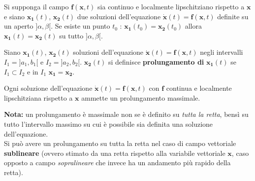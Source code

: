 \documentclass[10pt, oneside]{book}
\theoremstyle{plain}
\begin{document}
\begin{prop}
Si supponga il campo $\mathbf{f}(\mathbf{x}, t)$ sia continuo e localmente lipschitziano rispetto a $\mathbf{x}$ e siano $\mathbf{x_1}(t)$, $\mathbf{x_2}(t)$ due soluzioni dell'equazione $\dot{\mathbf{x}}(t) = \mathbf{f}(\mathbf{x}, t)$ definite su un aperto $]\alpha, \beta[$. Se esiste un punto $t_0$ : $\mathbf{x_1}(t_0) = \mathbf{x_2}(t_0)$ allora $\mathbf{x_1}(t) = \mathbf{x_2}(t)$ su tutto $]\alpha, \beta[$.
\end{prop} 

\begin{defin}
Siano $\mathbf{x_1}(t)$, $\mathbf{x_2}(t)$ soluzioni dell'equazione $\dot{\mathbf{x}}(t) = \mathbf{f}(\mathbf{x}, t)$ negli intervalli $I_1 = ]a_1, b_1[$ e $I_2 = ]a_2, b_2[$. $\mathbf{x_2}(t)$ si definisce \textbf{prolungamento di} $\mathbf{x_1}(t)$ se $I_1 \subset I_2$ e in $I_1$ $\mathbf{x_1} = \mathbf{x_2}$.
\end{defin}

\begin{ther}
Ogni soluzione dell'equazione $\dot{\mathbf{x}}(t) = \mathbf{f}(\mathbf{x}, t)$ con $\mathbf{f}$ continua e localmente lipschitziana rispetto a $\mathbf{x}$ ammette un prolungamento massimale.
\end{ther}
\textbf{Nota:} un prolungamento è massimale non se è definito su \textit{tutta la retta}, bensì su tutto l'intervallo massimo su cui è possibile sia definita una soluzione dell'equazione.\\
Si può avere un prolungamento su tutta la retta nel caso di campo vettoriale \textbf{sublineare} (ovvero stimato da una retta rispetto alla variabile vettoriale $\mathbf{x}$, caso opposto a campo \textit{sopralineare} che invece ha un andamento più rapido della retta).
\end{document}
